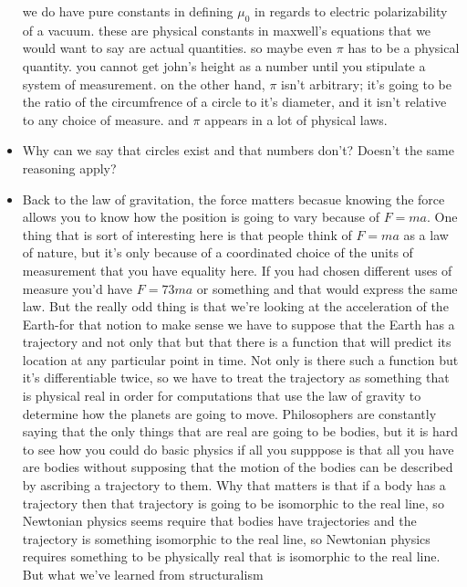 \documentclass[12pt]{article}
\theoremstyle{definition}
\begin{document}
\begin{itemize}
        we do have pure constants in defining $\mu_0$ in regards to electric
        polarizability of a vacuum. these are physical constants in maxwell's
        equations that we would want to say are actual quantities. so maybe
        even $\pi$ has to be a physical quantity. you cannot get john's height
        as a number until you stipulate a system of measurement. on the other
        hand, $\pi$ isn't arbitrary; it's going to be the ratio of the
        circumfrence of a circle to it's diameter, and it isn't relative to any
        choice of measure. and $\pi$ appears in a lot of physical laws. 
    \item
        Why can we say that circles exist and that numbers don't? Doesn't the
        same reasoning apply?
    \item
        Back to the law of gravitation, the force matters becasue knowing the
        force allows you to know how the position is going to vary because of
        $F = ma$. One thing that is sort of interesting here is that people
        think of $F = ma$ as a law of nature, but it's only because of a
        coordinated choice of the units of measurement that you have equality
        here. If you had chosen different uses of measure you'd have $F = 73ma$
        or something and that would express the same law. But the really odd
        thing is that we're looking at the acceleration of the Earth-for that
        notion to make sense we have to suppose that the Earth has a trajectory
        and not only that but that there is a function that will predict its
        location at any particular point in time. Not only is there such a
        function but it's differentiable twice, so we have to treat the
        trajectory as something that is physical real in order for computations
        that use the law of gravity to determine how the planets are going to
        move. Philosophers are constantly saying that the only things that are
        real are going to be bodies, but it is hard to see how you could do
        basic physics if all you supppose is that all you have are bodies
        without supposing that the motion of the bodies can be described by
        ascribing a trajectory to them. Why that matters is that if a body has
        a trajectory then that trajectory is going to be isomorphic to the real
        line, so Newtonian physics seems require that bodies have trajectories
        and the trajectory is something isomorphic to the real line, so
        Newtonian physics requires something to be physically real that is
        isomorphic to the real line. But what we've learned from structuralism

\end{itemize}
\end{document}
